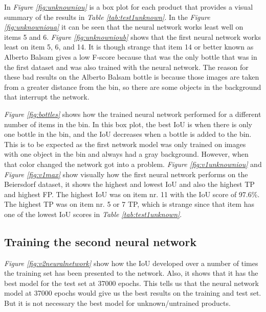 In \textit{Figure \ref{fig:unknowniou}} is a box plot for each product that provides a visual summary of the results in \textit{Table \ref{tab:test1unknown}}. In the \textit{Figure \ref{fig:unknownioua}} it can be seen that the neural network works least well on items 5 and 6. \textit{Figure \ref{fig:unknownioub}} shows that the first neural network works least on item 5, 6, and 14. It is though strange that item 14 or better known as Alberto Balsam gives a low F-score because that was the only bottle that was in the first dataset and was also trained with the neural network. The reason for these bad results on the Alberto Balsam bottle is because those images are taken from a greater distance from the bin, so there are some objects in the background that interrupt the network. 

\textit{Figure \ref{fig:bottles}} shows how the trained neural network performed for a different number of items in the bin. In this box plot, the best IoU is when there is only one bottle in the bin, and the IoU decreases when a bottle is added to the bin. This is to be expected as the first network model was only trained on images with one object in the bin and always had a gray background. However, when that color changed the network got into a problem.
\textit{Figure \ref{fig:v1unknowniou}} and \textit{Figure \ref{fig:v1max}} show visually how the first neural network performs on the Beiersdorf dataset, it shows the highest and lowest IoU and also the highest TP and highest FP. The highest IoU was on item nr. 11 with the IoU score of 97.6\%. The highest TP was on item nr. 5 or 7 TP, which is strange since that item has one of the lowest IoU scores in \textit{Table \ref{tab:test1unknown}}.

\subsection{Training the second neural network}
\textit{Figure \ref{fig:v2neuralnetwork}} show how the IoU developed over a number of times the training set has been presented to the network. Also, it shows that it has the best model for the test set at 37000 epochs. This tells us that the neural network model at 37000 epochs would give us the best results on the training and test set. But it is not necessary the best model for unknown/untrained products.


